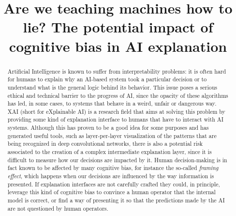 \documentclass[conference]{IEEEtran}
\begin{document}
\title{Are we teaching machines how to lie? The potential impact of cognitive bias in AI explanation}


\author{
    }

\maketitle

\begin{abstract}
    Artificial Intelligence is known to suffer from interpretability problems:
    it is often hard for humans to explain why an AI-based system took a
    particular decision or to understand what is the general logic behind its
    behavior.
    This issue poses a serious ethical and technical barrier to the progress
    of AI, since the opacity of these algorithms has led, in some cases, to  systems that behave in a weird, unfair or dangerous way.
    XAI (short for eXplainable AI) is a research field
    that aims at solving this problem by providing some kind of explanation
    interface to humans that have to interact with AI systems.
    Although this has proven to be a good idea for some purposes and has generated useful tools, such as layer-per-layer visualization of the patterns that are being recognized in deep convolutional networks, there is also a potential risk associated to the creation of a complex intermediate explanation layer, since it is difficult to measure how our decisions are impacted by it. Human
    decision-making is in fact known to be affected by many cognitive bias, for instance the so-called \textit{framing effect}, which happens when our
    decisions are influenced by the way information is presented.
    If explanation interfaces are not carefully crafted they could, in principle, leverage this kind of cognitive bias to convince a human operator that the internal model is correct, or find a way of presenting it so that the predictions made by the AI are not questioned by human operators.

\end{abstract}
\end{document}
